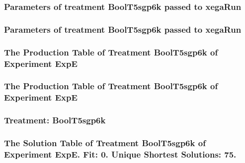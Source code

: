\documentclass[18pt,c]{beamer}
\begin{document}

 \begin{frame}
 \fontsize{8pt}{9pt}\selectfont
 \frametitle{  Parameters of treatment BoolT5sgp6k passed to xegaRun
 }

 \label{ExpEtParmTable038.tex}  
 \end{frame}


 \begin{frame}
 \fontsize{8pt}{9pt}\selectfont
 \frametitle{  Parameters of treatment BoolT5sgp6k passed to xegaRun
 }

 \label{ExpEtParmTable039.tex}  
 \end{frame}

 \begin{frame}
 \fontsize{8pt}{9pt}\selectfont
 \frametitle{ The Production Table of Treatment BoolT5sgp6k of Experiment ExpE }

 \label{ExpEGrammarTable013.tex}  
 \end{frame}

 \begin{frame}
 \fontsize{8pt}{9pt}\selectfont
 \frametitle{ The Production Table of Treatment BoolT5sgp6k of Experiment ExpE }

 \label{ExpEGrammarTable014.tex}  
 \end{frame}

 \begin{frame}
 \fontsize{8pt}{9pt}\selectfont
 \frametitle{ Treatment: BoolT5sgp6k }

 \label{ExpEStatsTable012.tex}  
 \end{frame}

 \begin{frame}
 \fontsize{8pt}{9pt}\selectfont
 \frametitle{ The Solution Table of Treatment BoolT5sgp6k of Experiment ExpE. Fit: 0. Unique Shortest Solutions: 75. }

 \label{ExpESolutionTable009.tex}  
 \end{frame}
\end{document}
